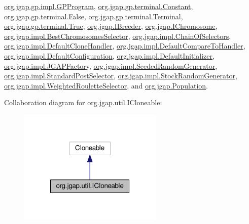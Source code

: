 \hyperlink{classorg_1_1jgap_1_1gp_1_1impl_1_1_g_p_program}{org.\-jgap.\-gp.\-impl.\-G\-P\-Program}, \hyperlink{classorg_1_1jgap_1_1gp_1_1terminal_1_1_constant}{org.\-jgap.\-gp.\-terminal.\-Constant}, \hyperlink{classorg_1_1jgap_1_1gp_1_1terminal_1_1_false}{org.\-jgap.\-gp.\-terminal.\-False}, \hyperlink{classorg_1_1jgap_1_1gp_1_1terminal_1_1_terminal}{org.\-jgap.\-gp.\-terminal.\-Terminal}, \hyperlink{classorg_1_1jgap_1_1gp_1_1terminal_1_1_true}{org.\-jgap.\-gp.\-terminal.\-True}, \hyperlink{interfaceorg_1_1jgap_1_1_i_breeder}{org.\-jgap.\-I\-Breeder}, \hyperlink{interfaceorg_1_1jgap_1_1_i_chromosome}{org.\-jgap.\-I\-Chromosome}, \hyperlink{classorg_1_1jgap_1_1impl_1_1_best_chromosomes_selector}{org.\-jgap.\-impl.\-Best\-Chromosomes\-Selector}, \hyperlink{classorg_1_1jgap_1_1impl_1_1_chain_of_selectors}{org.\-jgap.\-impl.\-Chain\-Of\-Selectors}, \hyperlink{classorg_1_1jgap_1_1impl_1_1_default_clone_handler}{org.\-jgap.\-impl.\-Default\-Clone\-Handler}, \hyperlink{classorg_1_1jgap_1_1impl_1_1_default_compare_to_handler}{org.\-jgap.\-impl.\-Default\-Compare\-To\-Handler}, \hyperlink{classorg_1_1jgap_1_1impl_1_1_default_configuration}{org.\-jgap.\-impl.\-Default\-Configuration}, \hyperlink{classorg_1_1jgap_1_1impl_1_1_default_initializer}{org.\-jgap.\-impl.\-Default\-Initializer}, \hyperlink{classorg_1_1jgap_1_1impl_1_1_j_g_a_p_factory}{org.\-jgap.\-impl.\-J\-G\-A\-P\-Factory}, \hyperlink{classorg_1_1jgap_1_1impl_1_1_seeded_random_generator}{org.\-jgap.\-impl.\-Seeded\-Random\-Generator}, \hyperlink{classorg_1_1jgap_1_1impl_1_1_standard_post_selector}{org.\-jgap.\-impl.\-Standard\-Post\-Selector}, \hyperlink{classorg_1_1jgap_1_1impl_1_1_stock_random_generator}{org.\-jgap.\-impl.\-Stock\-Random\-Generator}, \hyperlink{classorg_1_1jgap_1_1impl_1_1_weighted_roulette_selector}{org.\-jgap.\-impl.\-Weighted\-Roulette\-Selector}, and \hyperlink{classorg_1_1jgap_1_1_population}{org.\-jgap.\-Population}.



Collaboration diagram for org.\-jgap.\-util.\-I\-Cloneable\-:
\nopagebreak
\begin{figure}[H]
\begin{center}
\leavevmode
\includegraphics[width=194pt]{interfaceorg_1_1jgap_1_1util_1_1_i_cloneable__coll__graph}
\end{center}
\end{figure}
